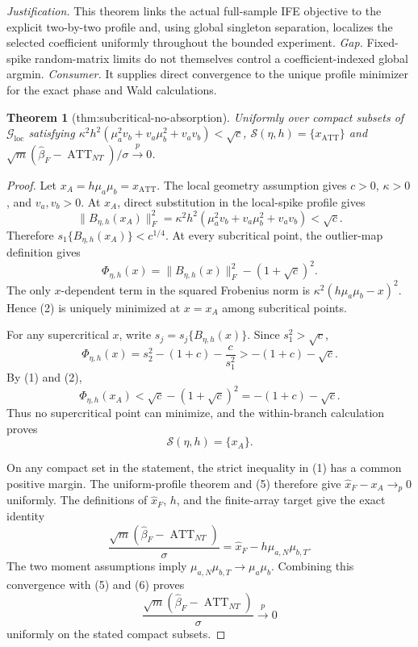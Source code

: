 \documentclass{article}
\newtheorem{theorem}{Theorem}
\begin{document}
\par\smallskip\noindent \textit{Justification.} This theorem links the actual full-sample IFE objective to the explicit two-by-two profile and, using global singleton separation, localizes the selected coefficient uniformly throughout the bounded experiment. \textit{Gap.} Fixed-spike random-matrix limits do not themselves control a coefficient-indexed global argmin. \textit{Consumer.} It supplies direct convergence to the unique profile minimizer for the exact phase and Wald calculations.

\begin{theorem}[thm:subcritical-no-absorption]\label{thm:subcritical-no-absorption}
Uniformly over compact subsets of \(\mathcal G_{\mathrm{loc}}\) satisfying \(\kappa^2h^2(\mu_a^2v_b+v_a\mu_b^2+v_av_b)<\sqrt c\), \(\mathcal S(\eta,h)=\{x_{\operatorname{ATT}}\}\) and \(\sqrt m(\widehat\beta_F-\operatorname{ATT}_{NT})/\sigma\xrightarrow{p}0\).
\end{theorem}
\begin{proof}
Let \(x_A=h\mu_a\mu_b=x_{\operatorname{ATT}}\).  The local geometry assumption gives \(c>0\), \(\kappa>0\), and \(v_a,v_b>0\).  At \(x_A\), direct substitution in the local-spike profile gives
\[
 \|B_{\eta,h}(x_A)\|_F^2
 =\kappa^2h^2(\mu_a^2v_b+v_a\mu_b^2+v_av_b)<\sqrt c. \tag{1}
\]
Therefore \(s_1\{B_{\eta,h}(x_A)\}<c^{1/4}\).  At every subcritical point, the outlier-map definition gives
\[
 \Phi_{\eta,h}(x)=\|B_{\eta,h}(x)\|_F^2-(1+\sqrt c)^2. \tag{2}
\]
The only \(x\)-dependent term in the squared Frobenius norm is
\(\kappa^2(h\mu_a\mu_b-x)^2\).  Hence (2) is uniquely minimized at \(x=x_A\) among subcritical points.

For any supercritical \(x\), write \(s_j=s_j\{B_{\eta,h}(x)\}\).  Since \(s_1^2>\sqrt c\),
\[
 \Phi_{\eta,h}(x)
 =s_2^2-(1+c)-\frac c{s_1^2}
 >-(1+c)-\sqrt c. \tag{3}
\]
By (1) and (2),
\[
 \Phi_{\eta,h}(x_A)
 <\sqrt c-(1+\sqrt c)^2
 =-(1+c)-\sqrt c. \tag{4}
\]
Thus no supercritical point can minimize, and the within-branch calculation proves
\[
 \mathcal S(\eta,h)=\{x_A\}. \tag{5}
\]

On any compact set in the statement, the strict inequality in (1) has a common positive margin.  The uniform-profile theorem and (5) therefore give \(\widehat x_F-x_A\to_p0\) uniformly.  The definitions of \(\widehat x_F\), \(h\), and the finite-array target give the exact identity
\[
 \frac{\sqrt m(\widehat\beta_F-\operatorname{ATT}_{NT})}{\sigma}
 =\widehat x_F-h\mu_{a,N}\mu_{b,T}. \tag{6}
\]
The two moment assumptions imply
\(\mu_{a,N}\mu_{b,T}\to\mu_a\mu_b\).  Combining this convergence with (5) and (6) proves
\[
 \frac{\sqrt m(\widehat\beta_F-\operatorname{ATT}_{NT})}{\sigma}\xrightarrow{p}0
\]
uniformly on the stated compact subsets.
\end{proof}
\end{document}
